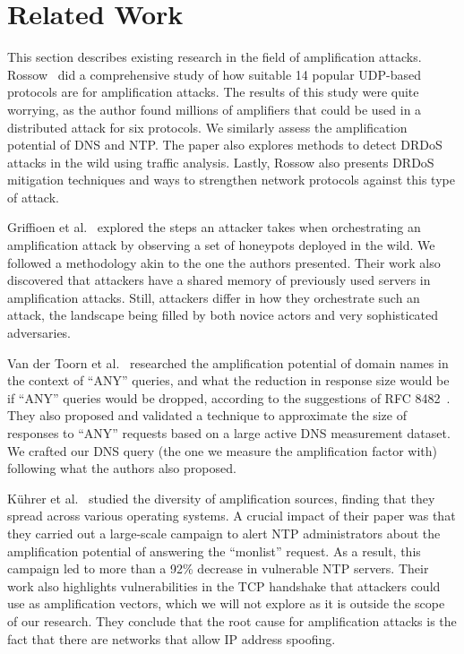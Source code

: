 \section{Related Work}

 This section describes existing research in the field of amplification attacks. Rossow~\cite{amplification_hell} did a comprehensive study of how suitable 14 popular UDP-based protocols are for amplification attacks. The results of this study were quite worrying, as the author found millions of amplifiers that could be used in a distributed attack for six protocols. We similarly assess the amplification potential of DNS and NTP. The paper also explores methods to detect DRDoS attacks in the wild using traffic analysis. Lastly, Rossow also presents  DRDoS mitigation techniques and ways to strengthen network protocols against this type of attack. 


 Griffioen et al.~\cite{griffioen_scan_2021} explored the steps an attacker takes when orchestrating an amplification attack by observing a set of honeypots deployed in the wild. We followed a methodology akin to the one the authors presented. Their work also discovered that attackers have a shared memory of previously used servers in amplification attacks. Still, attackers differ in how they orchestrate such an attack, the landscape being filled by both novice actors and very sophisticated adversaries. 


 Van der Toorn et al.~\cite{van_der_toorn_anyway_2021} researched the amplification potential of domain names in the context of ``ANY'' queries, and what the reduction in response size would be if ``ANY'' queries would be dropped, according to the suggestions of RFC 8482~\cite{rfc-8482}. They also proposed and validated a technique to approximate the size of responses to ``ANY'' requests based on a large active DNS measurement dataset. We crafted our DNS query (the one we measure the amplification factor with) following what the authors also proposed. 

 Kührer et al.~\cite{exit_hell} studied the diversity of amplification sources, finding that they spread across various operating systems. A crucial impact of their paper was that they carried out a large-scale campaign to alert NTP administrators about the amplification potential of answering the ``monlist'' request. As a result, this campaign led to more than a 92\%  decrease in vulnerable NTP servers. Their work also highlights vulnerabilities in the TCP handshake that attackers could use as amplification vectors, which we will not explore as it is outside the scope of our research. They conclude that the root cause for amplification attacks is the fact that there are networks that allow IP address spoofing. 

